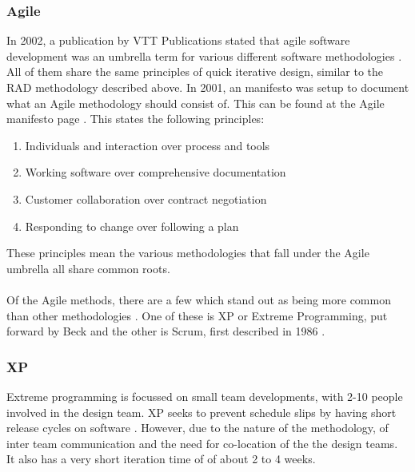 \documentclass[table,a4paper,oneside]{book}
\begin{document}
\subsubsection{Agile}
In 2002, a publication by VTT Publications stated that agile software development was an umbrella term for various different software methodologies \citep{abrahamsson2002agile}. All of them share the same principles of quick iterative design, similar to the RAD methodology described above. In 2001, an manifesto was setup to document what an Agile methodology should consist of. This can be found at the Agile manifesto page \citep{Beck2001}. This states the following principles:
\begin{enumerate}
\item Individuals and interaction over process and tools
\item Working software over comprehensive documentation
\item Customer collaboration over contract negotiation
\item Responding to change over following a plan
\end{enumerate}
These principles mean the various methodologies that fall under the Agile umbrella all share common roots.
\\
\\
Of the Agile methods, there are a few which stand out as being more common than other methodologies \citep{cohen2003agile}. One of these is XP or Extreme Programming, put forward by Beck \citep{beck2000extreme} and the other is Scrum, first described in 1986 \citep{takeuchi1986new}.

\subsubsection{XP}
Extreme programming is focussed on small team developments, with 2-10 people involved in the design team. XP seeks to prevent schedule slips by having short release cycles on software \citep{beck2000extreme}. However, due to the nature of the methodology, of inter team communication and the need for co-location of the the design teams. It also has a very short iteration time of of about 2 to 4 weeks.
\end{document}

